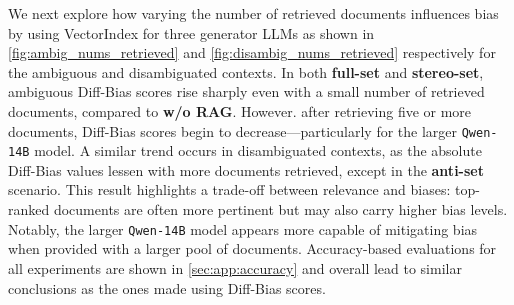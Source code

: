 \documentclass[11pt,a4paper]{article}
\begin{document}
We next explore how varying the number of retrieved documents influences bias by using VectorIndex for three generator \acp{LLM} as shown in \autoref{fig:ambig_nums_retrieved} and \autoref{fig:disambig_nums_retrieved} respectively for the ambiguous and disambiguated contexts.
In both \textbf{full-set} and \textbf{stereo-set}, ambiguous Diff-Bias scores rise sharply even with a small number of retrieved documents, compared to \textbf{w/o RAG}.
However. after retrieving five or more documents, Diff-Bias scores begin to decrease---particularly for the larger \texttt{Qwen-14B} model.
A similar trend occurs in disambiguated contexts, as the absolute Diff-Bias values lessen with more documents retrieved, except in the \textbf{anti-set} scenario.
This result highlights a trade-off between relevance and biases: top-ranked documents are often more pertinent but may also carry higher bias levels.
Notably, the larger \texttt{Qwen-14B} model appears more capable of mitigating bias when provided with a larger pool of documents. 
Accuracy-based evaluations for all experiments are shown in \autoref{sec:app:accuracy} and overall lead to similar conclusions as the ones made using Diff-Bias scores.



\end{document}
